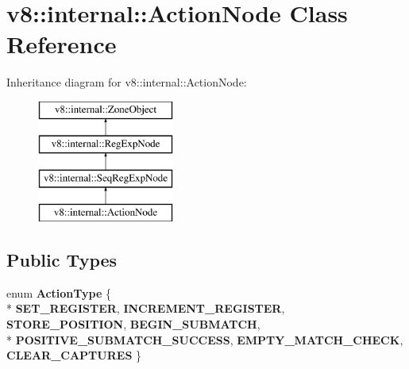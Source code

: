 \hypertarget{classv8_1_1internal_1_1_action_node}{}\section{v8\+:\+:internal\+:\+:Action\+Node Class Reference}
\label{classv8_1_1internal_1_1_action_node}
Inheritance diagram for v8\+:\+:internal\+:\+:Action\+Node\+:\begin{figure}[H]
\begin{center}
\leavevmode
\includegraphics[height=4.000000cm]{classv8_1_1internal_1_1_action_node}
\end{center}
\end{figure}
\subsection*{Public Types}
\begin{DoxyCompactItemize}
\item 
\hypertarget{classv8_1_1internal_1_1_action_node_ab695380c09977f360b2d4f817f9124bc}{}enum {\bfseries Action\+Type} \{ \\*
{\bfseries S\+E\+T\+\_\+\+R\+E\+G\+I\+S\+T\+E\+R}, 
{\bfseries I\+N\+C\+R\+E\+M\+E\+N\+T\+\_\+\+R\+E\+G\+I\+S\+T\+E\+R}, 
{\bfseries S\+T\+O\+R\+E\+\_\+\+P\+O\+S\+I\+T\+I\+O\+N}, 
{\bfseries B\+E\+G\+I\+N\+\_\+\+S\+U\+B\+M\+A\+T\+C\+H}, 
\\*
{\bfseries P\+O\+S\+I\+T\+I\+V\+E\+\_\+\+S\+U\+B\+M\+A\+T\+C\+H\+\_\+\+S\+U\+C\+C\+E\+S\+S}, 
{\bfseries E\+M\+P\+T\+Y\+\_\+\+M\+A\+T\+C\+H\+\_\+\+C\+H\+E\+C\+K}, 
{\bfseries C\+L\+E\+A\+R\+\_\+\+C\+A\+P\+T\+U\+R\+E\+S}
 \}\label{classv8_1_1internal_1_1_action_node_ab695380c09977f360b2d4f817f9124bc}

\end{DoxyCompactItemize}
